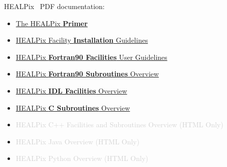 \documentclass[12pt,twoside]{article}
\begin{document}
\thispagestyle{empty}



{\Large HEALPix \hpxversion\ PDF documentation:}
\begin{itemize}
    \item \href{intro.pdf}{The HEALPix \textbf{Primer}}
    \item \href{install.pdf}{HEALPix Facility \textbf{Installation} Guidelines}
    \item \href{facilites.pdf}{HEALPix \textbf{Fortran90 Facilities} User Guidelines}
    \item \href{subroutines.pdf}{HEALPix \textbf{Fortran90 Subroutines} Overview}
    \item \href{idl.pdf}{HEALPix \textbf{IDL Facilities} Overview}
    \item \href{csub.pdf}{HEALPix \textbf{C Subroutines} Overview}
    \item \textcolor{lightgray} {HEALPix C++ Facilities and Subroutines Overview (HTML Only)}
    \item \textcolor{lightgray} {HEALPix Java Overview (HTML Only)}
    \item \textcolor{lightgray} {HEALPix Python Overview (HTML Only)}
\end{itemize}
\end{document}
